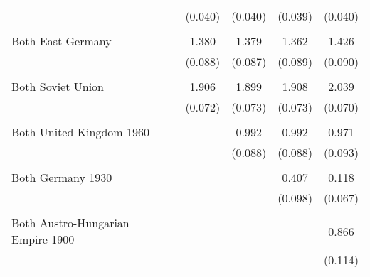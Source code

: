 {\begin{tabular}{l*{5}{c}}
            &                     &     (0.040)         &     (0.040)         &     (0.039)         &     (0.040)         \\
            &                     &                     &                     &                     &                     \\
Both East Germany&                     &       1.380\sym{***}&       1.379\sym{***}&       1.362\sym{***}&       1.426\sym{***}\\
            &                     &     (0.088)         &     (0.087)         &     (0.089)         &     (0.090)         \\
            &                     &                     &                     &                     &                     \\
Both Soviet Union&                     &       1.906\sym{***}&       1.899\sym{***}&       1.908\sym{***}&       2.039\sym{***}\\
            &                     &     (0.072)         &     (0.073)         &     (0.073)         &     (0.070)         \\
            &                     &                     &                     &                     &                     \\
Both United Kingdom 1960&                     &                     &       0.992\sym{***}&       0.992\sym{***}&       0.971\sym{***}\\
            &                     &                     &     (0.088)         &     (0.088)         &     (0.093)         \\
            &                     &                     &                     &                     &                     \\
Both Germany 1930&                     &                     &                     &       0.407\sym{***}&       0.118\sym{*}  \\
            &                     &                     &                     &     (0.098)         &     (0.067)         \\
            &                     &                     &                     &                     &                     \\
Both Austro-Hungarian Empire 1900&                     &                     &                     &                     &       0.866\sym{***}\\
            &                     &                     &                     &                     &     (0.114)         \\

\end{tabular}}
